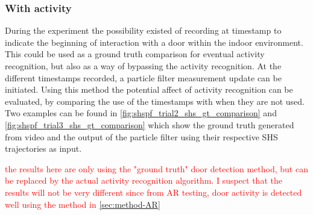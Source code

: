 \subsubsection{With activity}
During the experiment the possibility existed of recording at timestamp to indicate the beginning of interaction with a door within the indoor environment. This could be used as a ground truth comparison for eventual activity recognition, but also as a way of bypassing the activity recognition. At the different timestamps recorded, a particle filter measurement update can be initiated. Using this method the potential affect of activity recognition can be evaluated, by comparing the use of the timestamps with when they are not used. Two examples can be found in \cref{fig:shspf_trial2_shs_gt_comparison} and \cref{fig:shspf_trial3_shs_gt_comparison} which show the ground truth generated from video and the output of the particle filter using their respective SHS trajectories as input.

\textcolor{red}{the results here are only using the "ground truth" door detection method, but can be replaced by the actual activity recognition algorithm. I suspect that the results will not be very different since from AR testing, door activity is detected well using the method in \cref{sec:method-AR}}

